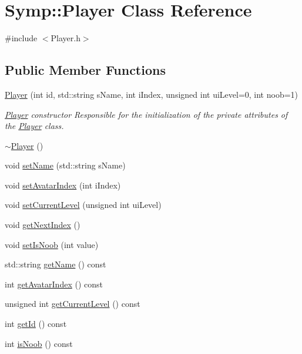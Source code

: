 \hypertarget{class_symp_1_1_player}{\section{Symp\-:\-:Player Class Reference}
\label{class_symp_1_1_player}
}


{\ttfamily \#include $<$Player.\-h$>$}

\subsection*{Public Member Functions}
\begin{DoxyCompactItemize}
\item 
\hyperlink{class_symp_1_1_player_a098f6fbf55316b128193c3b1dad5c1cc}{Player} (int id, std\-::string s\-Name, int i\-Index, unsigned int ui\-Level=0, int noob=1)
\begin{DoxyCompactList}\small\item\em \hyperlink{class_symp_1_1_player}{Player} constructor Responsible for the initialization of the private attributes of the \hyperlink{class_symp_1_1_player_a098f6fbf55316b128193c3b1dad5c1cc}{Player} class. \end{DoxyCompactList}\item 
\hyperlink{class_symp_1_1_player_a99689aeaac524f00f8fbb2c5899e95ea}{$\sim$\-Player} ()
\item 
void \hyperlink{class_symp_1_1_player_a3fec865b652207409bcfe9ec40984b37}{set\-Name} (std\-::string s\-Name)
\item 
void \hyperlink{class_symp_1_1_player_ad05ec0c0bbb5e7d26bb83ce340ff68a0}{set\-Avatar\-Index} (int i\-Index)
\item 
void \hyperlink{class_symp_1_1_player_a4f049dbae746efe473e55ee00c77e51e}{set\-Current\-Level} (unsigned int ui\-Level)
\item 
void \hyperlink{class_symp_1_1_player_a02478041365ba15d479606771a81ff7c}{get\-Next\-Index} ()
\item 
void \hyperlink{class_symp_1_1_player_ac269df6657de9786582c64d4ba810982}{set\-Is\-Noob} (int value)
\item 
std\-::string \hyperlink{class_symp_1_1_player_a538ceb0900078f0d0092bf263f2932f8}{get\-Name} () const 
\item 
int \hyperlink{class_symp_1_1_player_ab85e8564639806696c756e0f8e759fa8}{get\-Avatar\-Index} () const 
\item 
unsigned int \hyperlink{class_symp_1_1_player_a1b9e2ac8871b2a14244dc2bf2e7ba315}{get\-Current\-Level} () const 
\item 
int \hyperlink{class_symp_1_1_player_a0b0b0af7dca6dc2c1d59bbd7439ba462}{get\-Id} () const 
\item 
int \hyperlink{class_symp_1_1_player_a5a49b5814d2e74aa556f9214a1af518e}{is\-Noob} () const 
\end{DoxyCompactItemize}


